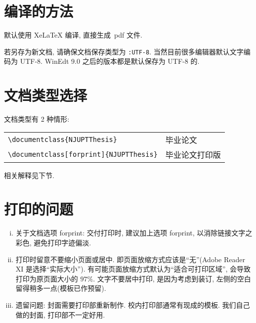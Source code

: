 \documentclass{NJUPTThesis}%
\begin{document}
\section{编译的方法}\label{sec-compile}

默认使用 XeLaTeX 编译, 直接生成~pdf 文件.

若另存为新文档, 请确保文档保存类型为 \verb|:UTF-8|. 当然目前很多编辑器默认文字编码为 UTF-8.
WinEdt 9.0 之后的版本都是默认保存为 UTF-8 的.


%





\section{文档类型选择}
文档类型有 2 种情形:

\begin{table}[ht]\centering
\begin{tabular}{ll}
\hline
   \verb|\documentclass{NJUPTThesis}|                     &  毕业论文 \\
   \verb|\documentclass[forprint]{NJUPTThesis}|        &  毕业论文打印版 \\
\hline
\end{tabular}
\end{table}
相关解释见下节.


\section{打印的问题}
\begin{enumerate}[i)]
  \item  关于文档选项 forprint: 交付打印时, 建议加上选项 forprint, 以消除链接文字之彩色, 避免打印字迹偏淡.
  \item  打印时留意不要缩小页面或居中. 即页面放缩方式应该是``无''(Adobe Reader XI 是选择``实际大小'').
           有可能页面放缩方式默认为``适合可打印区域'', 会导致打印为原页面大小的 $97\%$.
           文字不要居中打印, 是因为考虑到装订, 左侧的空白留得稍多一点(模板已作预留).
  \item  遗留问题: 封面需要打印部重新制作.  校内打印部通常有现成的模板.
           我们自己做的封面, 打印部不一定好用.
\end{enumerate}
\end{document}
